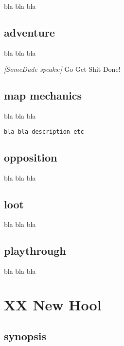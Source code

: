 bla bla bla


\subsection*{adventure}

bla bla bla

\begin{readoutloud}
\emph{[SomeDude speaks:]}
Go Get Shit Done!
\end{readoutloud}


\subsection*{map mechanics}

bla bla bla

\small \begin{verbatim}
bla bla description etc
\end{verbatim} \normalsize


\subsection*{opposition}

bla bla bla


\subsection*{loot}

bla bla bla


\subsection*{playthrough}

bla bla bla






\newpage
\section*{XX New Hool}


\subsection*{synopsis}

